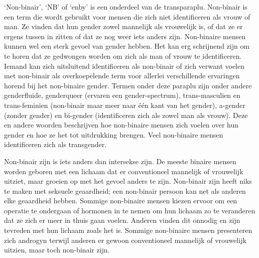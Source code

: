 \documentclass[12pt,openany]{book}
\begin{document}
`Non-binair', `NB' of `enby' is een onderdeel van de transparaplu. Non-binair is een term die wordt gebruikt voor mensen die zich niet identificeren als vrouw of man. Ze vinden dat hun gender zowel mannelijk als vrouwelijk is, of dat ze er ergens tussen in zitten of dat ze nog weer iets anders zijn. Non-binaire mensen kunnen wel een sterk gevoel van gender hebben. Het kan erg schrijnend zijn om te horen dat ze gedwongen worden om zich als man of vrouw te identificeren. Iemand kan zich uitsluitend identificeren als non-binair of zich verwant voelen met non-binair als overkoepelende term voor allerlei verschillende ervaringen horend bij het non-binaire gender. Termen onder deze paraplu zijn onder andere genderfluide, genderqueer (ervaren een gender-spectrum), trans-masculien en trans-feminien (non-binair maar meer naar één kant van het gender), a-gender (zonder gender) en bi-gender (identificeren zich als zowel man als vrouw). Deze en andere woorden beschrijven hoe non-binaire mensen zich voelen over hun gender en hoe ze het tot uitdrukking brengen. Veel non-binaire mensen identificeren zich als transgender. 

\begin{figure}[h]
    \centering
\end{figure}

Non-binair zijn is iets anders dan intersekse zijn. De meeste binaire mensen worden geboren met een lichaam dat er conventioneel mannelijk of vrouwelijk uitziet, maar groeien op met het gevoel anders te zijn. Non-binair zijn heeft niks te maken met seksuele geaardheid; een non-binair persoon kan net als anderen elke geaardheid hebben. Sommige non-binaire mensen kiezen ervoor om een operatie te ondergaan of hormonen in te nemen om hun lichaam zo te veranderen dat ze zich er meer in thuis gaan voelen. Anderen vinden dit onnodig en zijn tevreden met hun lichaam zoals het is. Sommige non-binaire mensen presenteren zich androgyn terwijl anderen er gewoon conventioneel mannelijk of vrouwelijk uitzien, maar toch non-binair zijn.
\end{document}
